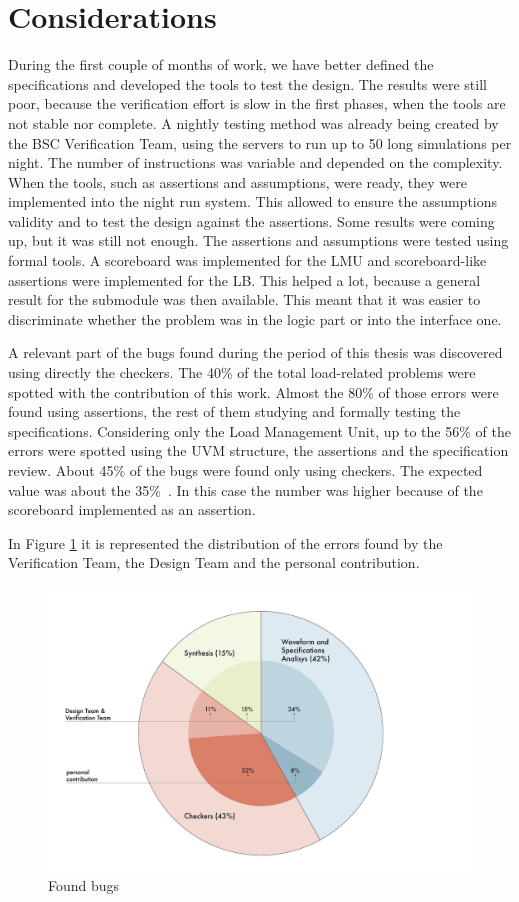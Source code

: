\section{Considerations}
During the first couple of months of work, we have better defined the specifications and developed the tools to test the design.
The results were still poor, because the verification effort is slow in the first phases, when the tools are not stable nor complete.
A nightly testing method was already being created by the BSC Verification Team, using the servers to run up to 50 long simulations per night. The number of instructions was variable and depended on the complexity.
When the tools, such as assertions and assumptions, were ready, they were implemented into the night run system.
This allowed to ensure the assumptions validity and to test the design against the assertions.
Some results were coming up, but it was still not enough. 
The assertions and assumptions were tested using formal tools. A scoreboard was implemented for the LMU and scoreboard-like assertions were implemented for the LB. This helped a lot, because a general result for the submodule was then available. This meant that it was easier to discriminate whether the problem was in the logic part or into the interface one.

A relevant part of the bugs found during the period of this thesis was discovered using directly the checkers. The 40\% of the total load-related problems were spotted with the contribution of this work. Almost the 80\% of those errors were found using assertions, the rest of them studying and formally testing the specifications. 
Considering only the Load Management Unit, up to the 56\% of the errors were spotted using the UVM structure, the assertions and the specification review. About 45\% of the bugs were found only using checkers. The expected value was about the 35\%~\cite{results}. In this case the number was higher because of the scoreboard implemented as an assertion.

In Figure \ref{torta} it is represented the distribution of the errors found by the Verification Team, the Design Team and the personal contribution.

\begin{figure}[H]
    \centering
    \includegraphics[scale = 0.6]{Chapter_3/img/torta.png}
    \caption{Found bugs}
    \label{torta}
\end{figure}

